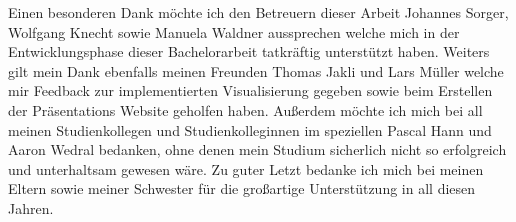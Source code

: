 Einen besonderen Dank möchte ich den Betreuern dieser Arbeit Johannes Sorger, Wolfgang Knecht sowie Manuela Waldner aussprechen welche mich in der Entwicklungsphase dieser Bachelorarbeit tatkräftig unterstützt haben.
Weiters gilt mein Dank ebenfalls meinen Freunden Thomas Jakli und Lars Müller welche mir Feedback zur implementierten Visualisierung gegeben sowie beim Erstellen der Präsentations Website geholfen haben.
Außerdem möchte ich mich bei all meinen Studienkollegen und Studienkolleginnen im speziellen Pascal Hann und Aaron Wedral bedanken, ohne denen mein Studium sicherlich nicht so erfolgreich und unterhaltsam gewesen wäre. 
Zu guter Letzt bedanke ich mich bei meinen Eltern sowie meiner Schwester für die großartige Unterstützung in all diesen Jahren.